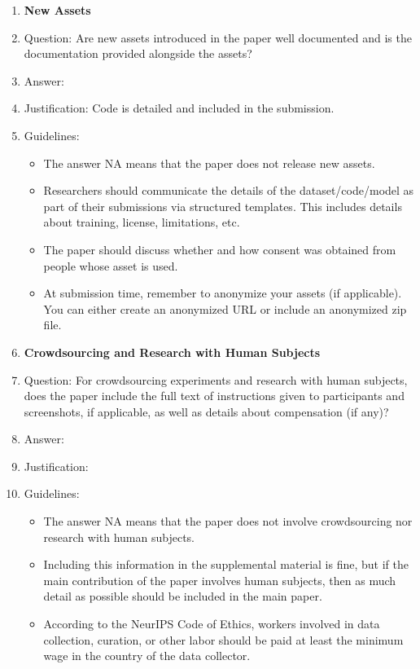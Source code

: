 \documentclass{article}
\theoremstyle{plain}
\theoremstyle{definition}
\theoremstyle{remark}
\begin{document}
\begin{enumerate}
\item {\bf New Assets}
    \item[] Question: Are new assets introduced in the paper well documented and is the documentation provided alongside the assets?
    \item[] Answer: \answerYes{} %
    \item[] Justification: Code is detailed and included in the submission.
    \item[] Guidelines:
    \begin{itemize}
        \item The answer NA means that the paper does not release new assets.
        \item Researchers should communicate the details of the dataset/code/model as part of their submissions via structured templates. This includes details about training, license, limitations, etc. 
        \item The paper should discuss whether and how consent was obtained from people whose asset is used.
        \item At submission time, remember to anonymize your assets (if applicable). You can either create an anonymized URL or include an anonymized zip file.
    \end{itemize}

\item {\bf Crowdsourcing and Research with Human Subjects}
    \item[] Question: For crowdsourcing experiments and research with human subjects, does the paper include the full text of instructions given to participants and screenshots, if applicable, as well as details about compensation (if any)? 
    \item[] Answer: \answerNA{} %
    \item[] Justification: 
    \item[] Guidelines:
    \begin{itemize}
        \item The answer NA means that the paper does not involve crowdsourcing nor research with human subjects.
        \item Including this information in the supplemental material is fine, but if the main contribution of the paper involves human subjects, then as much detail as possible should be included in the main paper. 
        \item According to the NeurIPS Code of Ethics, workers involved in data collection, curation, or other labor should be paid at least the minimum wage in the country of the data collector. 
    \end{itemize}


\end{enumerate}
\end{document}
